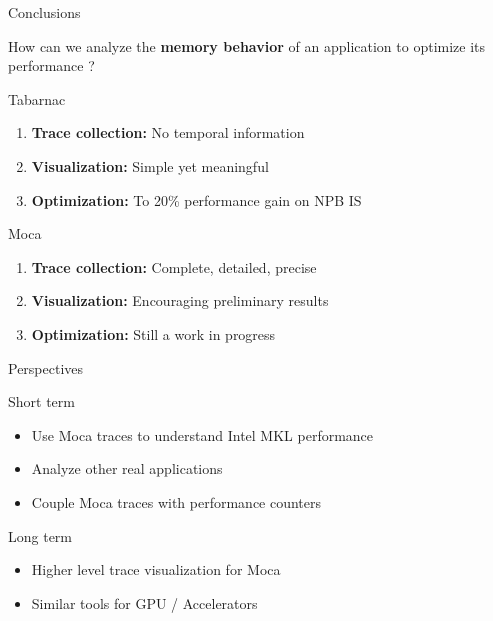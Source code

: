 \documentclass[xcolor={usenames,dvipsnames},hyperref={pdfusetitle}]{beamer}
\begin{document}
\begin{frame}{Conclusions}
    \begin{exampleblock}{}
        How can we analyze the \textbf{memory behavior} of an application to optimize its performance ?
    \end{exampleblock}
    \pause
    \begin{block}{Tabarnac~\cite{Beniamine15TABARNAC}}
        \begin{enumerate}
            \item \textbf{Trace collection:} No temporal information
            \item \textbf{Visualization:} Simple yet meaningful
            \item \textbf{Optimization:} To 20\% performance gain on NPB IS
        \end{enumerate}           
    \end{block}
    \pause
    \begin{exampleblock}{Moca~\cite{Beniamine15Memory,Beniamine16Moca}}
        \begin{enumerate}
            \item \textbf{Trace collection:} Complete, detailed, precise
            \item \textbf{Visualization:} Encouraging preliminary results
            \item \textbf{Optimization:} Still a work in progress
        \end{enumerate}          
    \end{exampleblock}
\end{frame}

\begin{frame}{Perspectives}
    \begin{block}{Short term}
        \begin{itemize}
            \item Use Moca traces to understand Intel MKL performance
            \item Analyze other real applications
            \item Couple Moca traces with performance counters
        \end{itemize}
    \end{block}
    \pause
    \begin{block}{Long term}
        \begin{itemize}
            \item Higher level trace visualization for Moca
            \item Similar tools for GPU / Accelerators
        \end{itemize}
    \end{block}
\end{frame}
\end{document}
